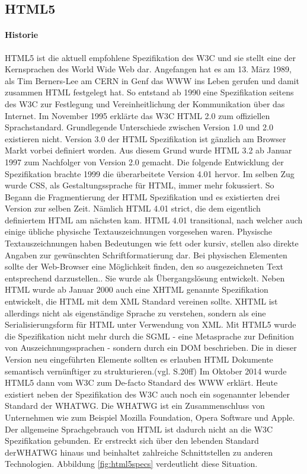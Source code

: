 \documentclass[12pt,a4paper,bibliography=totocnumbered,listof=totocnumbered]{scrartcl}
\begin{document}
\subsection{HTML5}
\paragraph{Historie} \ac{HTML}5 ist die aktuell empfohlene Spezifikation des \ac{W3C} und sie stellt eine der Kernsprachen des World Wide Web dar. Angefangen hat es am 13. März 1989, als Tim Berners-Lee am CERN in Genf das \ac{WWW} ins Leben gerufen und damit zusammen \ac{HTML} festgelegt hat. So entstand ab 1990 eine Spezifikation seitens des \ac{W3C} zur Festlegung und Vereinheitlichung der Kommunikation über das Internet. Im November 1995 erklärte das \ac{W3C} \ac{HTML} 2.0 zum offiziellen Sprachstandard. Grundlegende Unterschiede zwischen Version 1.0 und 2.0 existieren nicht. Version 3.0 der \ac{HTML} Spezifikation ist gänzlich am Browser Markt vorbei definiert worden. Aus diesem Grund wurde \ac{HTML} 3.2 ab Januar 1997 zum Nachfolger von Version 2.0 gemacht. Die folgende Entwicklung der Spezifikation brachte 1999 die überarbeitete Version 4.01 hervor. Im selben Zug wurde \ac{CSS}, als Gestaltungssprache für \ac{HTML}, immer mehr fokussiert. So Begann die Fragmentierung der \ac{HTML} Spezifikation und es existierten drei Version zur selben Zeit. Nämlich \ac{HTML} 4.01 strict, die dem eigentlich definiertem HTML am nächsten kam. \ac{HTML} 4.01 transitional, nach welcher auch einige übliche physische Textauszeichnungen vorgesehen waren. \glqq Physische Textauszeichnungen haben Bedeutungen wie \glqq fett\grqq{} oder \glqq kursiv\grqq{}, stellen also direkte Angaben zur gewünschten Schriftformatierung dar. Bei physischen Elementen sollte der Web-Browser eine Möglichkeit finden, den so ausgezeichneten Text entsprechend darzustellen.\grqq{}\cite{SelfHTML2014}. Sie wurde als Übergangslösung entwickelt. Neben \ac{HTML} wurde ab Januar 2000 auch eine \ac{XHTML} genannte Spezifikation entwickelt, die \ac{HTML} mit dem \ac{XML} Standard vereinen sollte. \ac{XHTML} ist allerdings nicht als eigenständige Sprache zu verstehen, sondern als eine Serialisierungsform für \ac{HTML} unter Verwendung von \ac{XML}. Mit \ac{HTML}5 wurde die Spezifikation nicht mehr durch die \ac{SGML} - eine Metasprache zur Definition von Auszeichnungssprachen - sondern durch ein \ac{DOM} beschrieben. Die in dieser Version neu eingeführten Elemente sollten es erlauben \ac{HTML} Dokumente semantisch vernünftiger zu strukturieren.(vgl. \cite{MunzHTML2012} S.20ff) Im Oktober 2014 wurde \ac{HTML}5 dann vom \ac{W3C} zum De-facto Standard des \ac{WWW} erklärt. Heute existiert neben der Spezifikation des \ac{W3C} auch noch ein sogenannter \glqq lebender Standard\grqq{} der \ac{WHATWG}. Die \ac{WHATWG} ist ein Zusammenschluss von Unternehmen wie zum Beispiel Mozilla Foundation, Opera Software und Apple. Der allgemeine Sprachgebrauch von \ac{HTML} ist dadurch nicht an die \ac{W3C} Spezifikation gebunden. Er erstreckt sich über den \glqq lebenden Standard\grqq{} der\ac{WHATWG} hinaus und beinhaltet zahlreiche Schnittstellen zu anderen Technologien. Abbildung \ref{fig:html5specs} verdeutlicht diese Situation.
\end{document}
